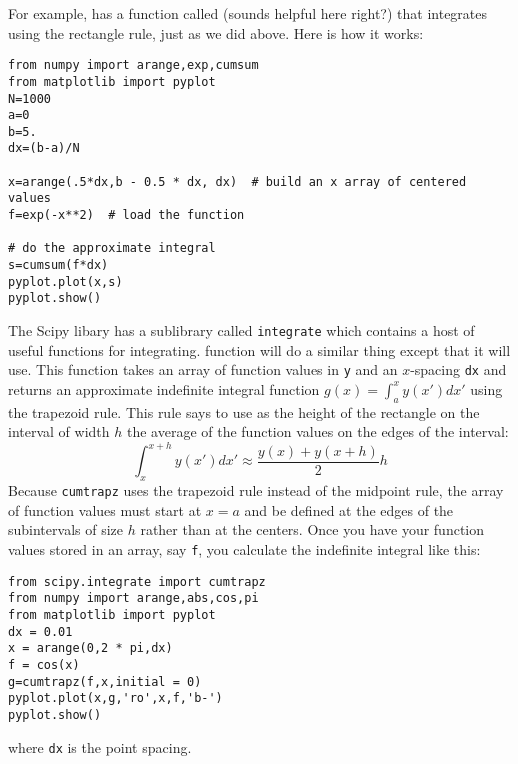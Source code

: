 For example, 
has a function called  (sounds helpful here right?) that
integrates using the rectangle rule, just as we did above. Here is how
it works:

\begin{Verbatim}
from numpy import arange,exp,cumsum
from matplotlib import pyplot
N=1000
a=0
b=5.
dx=(b-a)/N

x=arange(.5*dx,b - 0.5 * dx, dx)  # build an x array of centered values
f=exp(-x**2)  # load the function

# do the approximate integral
s=cumsum(f*dx)
pyplot.plot(x,s)
pyplot.show()
\end{Verbatim}

The Scipy libary has a sublibrary called {\tt integrate} which
contains a host of useful functions for integrating.  function will do a similar thing except that it
will use.
 This function takes an array of function
values in {\tt y} and an $x$-spacing {\tt dx} and returns an approximate
indefinite integral function $g(x)=\int_a^x y(x') dx'$ using the trapezoid
rule. This rule says to use as the height of the rectangle on the interval of
width $h$ the average of the function values on the edges of the interval:
\begin{equation}
\int_x^{x+h} y(x') dx' \approx \frac{y(x)+y(x+h) }{ 2} h
\end{equation}
Because \texttt{cumtrapz} uses the trapezoid rule instead of the midpoint
rule, the array of function values must start at $x=a$ and be defined at the
edges of the subintervals of size $h$ rather than at the centers.  Once you
have your function values stored in an array, say \texttt{f}, you calculate
the indefinite integral like this:
\begin{Verbatim}
from scipy.integrate import cumtrapz
from numpy import arange,abs,cos,pi
from matplotlib import pyplot
dx = 0.01
x = arange(0,2 * pi,dx)
f = cos(x)
g=cumtrapz(f,x,initial = 0)
pyplot.plot(x,g,'ro',x,f,'b-')
pyplot.show()
\end{Verbatim}
where \texttt{dx} is the point spacing.

